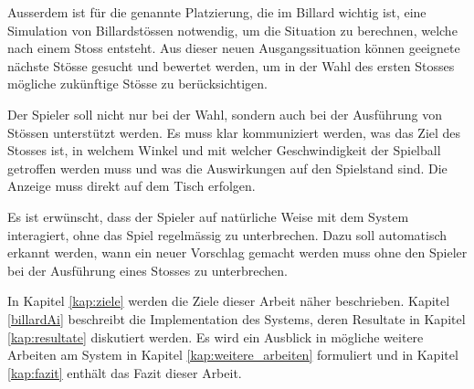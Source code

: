 Ausserdem ist für die genannte Platzierung, die im Billard wichtig ist, eine Simulation von Billardstössen notwendig,
um die Situation zu berechnen, welche nach einem Stoss entsteht.
Aus dieser neuen Ausgangssituation können geeignete nächste Stösse gesucht und bewertet werden, um in der Wahl des
ersten Stosses mögliche zukünftige Stösse zu berücksichtigen.

Der Spieler soll nicht nur bei der Wahl, sondern auch bei der Ausführung von Stössen unterstützt werden.
Es muss klar kommuniziert werden, was das Ziel des Stosses ist, in welchem Winkel und mit welcher Geschwindigkeit
der Spielball getroffen werden muss und was die Auswirkungen auf den Spielstand sind.
Die Anzeige muss direkt auf dem Tisch erfolgen.

Es ist erwünscht, dass der Spieler auf natürliche Weise mit dem System interagiert, ohne das Spiel regelmässig zu unterbrechen.
Dazu soll automatisch erkannt werden, wann ein neuer Vorschlag gemacht werden muss ohne den Spieler bei der Ausführung
eines Stosses zu unterbrechen.

In Kapitel \ref{kap:ziele} werden die Ziele dieser Arbeit näher beschrieben.
Kapitel \ref{billardAi} beschreibt die Implementation des Systems, deren Resultate in Kapitel \ref{kap:resultate}
diskutiert werden.
Es wird ein Ausblick in mögliche weitere Arbeiten am System in Kapitel \ref{kap:weitere_arbeiten} formuliert und
in Kapitel \ref{kap:fazit} enthält das Fazit dieser Arbeit.
